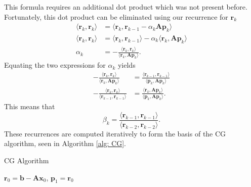 This formula requires an additional dot product which was not present before. Fortunately, this dot product can be eliminated using our recurrence for $\bm{r}_k$
\begin{align*}
    \langle \bm{r}_k , \bm{r}_k \rangle & = \langle \bm{r}_k , \bm{r}_{k-1} - \alpha_k \bm{A} \bm{p}_k \rangle                            \\
    \langle \bm{r}_k , \bm{r}_k \rangle & = \langle \bm{r}_k , \bm{r}_{k-1} \rangle - \alpha_k \langle \bm{r}_k , \bm{A} \bm{p}_k \rangle \\
    \alpha_k                            & = - \frac{\langle \bm{r}_k , \bm{r}_k \rangle}{\langle \bm{r}_k , \bm{A} \bm{p}_k \rangle}.
\end{align*}
Equating the two expressions for $\alpha_k$ yields
\begin{align*}
    - \frac{\langle \bm{r}_k , \bm{r}_k \rangle}{\langle \bm{r}_k , \bm{A} \bm{p}_k \rangle}  & = \frac{\langle \bm{r}_{k-1} , \bm{r}_{k-1} \rangle}{\langle \bm{p}_k, \bm{A} \bm{p}_k \rangle} \\
    - \frac{\langle \bm{r}_k , \bm{r}_k \rangle}{\langle \bm{r}_{k-1} , \bm{r}_{k-1} \rangle} & = \frac{\langle \bm{r}_k , \bm{A} \bm{p}_k \rangle}{\langle \bm{p}_k, \bm{A} \bm{p}_k \rangle}.
\end{align*}
This means that
\[
    \beta_k = \frac{\langle \bm{r}_{k-1} , \bm{r}_{k-1} \rangle}{\langle \bm{r}_{k-2} , \bm{r}_{k-2} \rangle}.
\]
These recurrences are computed iteratively to form the basis of the CG algorithm, seen in Algorithm \ref{alg: CG}.

{\centering
\begin{minipage}{.85\linewidth}
    \begin{algorithm}[H]
        \caption{CG Algorithm}
        \label{alg: CG}
        \SetAlgoLined
        \DontPrintSemicolon

        \BlankLine
        $\bm{r}_0 = \bm{b} - \bm{A} \bm{x}_0$, $\bm{p}_1 = \bm{r}_0$\;
        \BlankLine
    \end{algorithm}
\end{minipage}
\par
}

